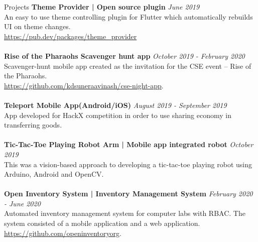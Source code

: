 \documentclass{cv}
\begin{document}
\begin{adjustwidth}{55pt}{0pt}
\begin{rSection}{Projects}
{\bf Theme Provider | Open source plugin}                       \hfill {\em June 2019} 
\\An easy to use theme controlling plugin for Flutter which automatically rebuilds UI on theme changes.\\
\url{https://pub.dev/packages/theme\_provider} \\
\\{\bf Rise of the Pharaohs Scavenger hunt app}                 \hfill {\em October 2019 - February 2020} 
\\Scavenger-hunt mobile app created as the invitation for the CSE event – Rise of the Pharaohs.\\
\url{https://github.com/kdsuneraavinash/cse-night-app}. \\
\\{\bf Teleport Mobile App(Android/iOS)}                        \hfill {\em August 2019 - September 2019} 
\\App developed for HackX competition in order to use sharing economy in transferring goods. \\
\\{\bf Tic-Tac-Toe Playing Robot Arm | Mobile app integrated robot}     \hfill {\em October 2019}
\\This was a vision-based approach to developing a tic-tac-toe playing robot using Arduino, Android and OpenCV.\\
\\{\bf Open Inventory System | Inventory Management System}     \hfill {\em February 2020 - June 2020} 
\\Automated inventory management system for computer labs with RBAC. The system consisted of a mobile application and a web application.\\
\url{https://github.com/openinventoryorg}.\\
\end{rSection}

\end{adjustwidth}
\end{document}
